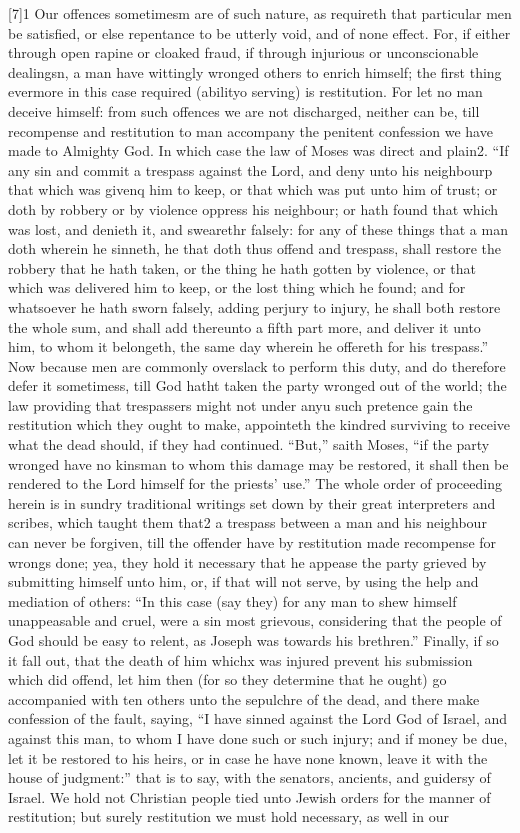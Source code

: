 [7]1 Our offences sometimesm are of such nature, as requireth that particular men be satisfied, or else repentance to be utterly void, and of none effect. For, if either through open rapine or cloaked fraud, if through injurious or unconscionable dealingsn, a man have wittingly wronged others to enrich himself; the first thing evermore in this case required (abilityo serving) is restitution. For let no man deceive himself: from such offences we are not discharged, neither can be, till recompense and restitution to man accompany the penitent confession we have made to Almighty God. In which case the law of Moses was direct and plain2. “If any sin and commit a trespass against the Lord, and deny unto his neighbourp that which was givenq him to keep, or that which was put unto him of trust; or doth by robbery or by violence oppress his neighbour; or hath found that which was lost, and denieth it, and swearethr falsely: for any of these things that a man doth wherein he sinneth, he that doth thus offend and trespass, shall restore the robbery that he hath taken, or the thing he hath gotten by violence, or that which was delivered him to keep, or the lost thing which he found; and for whatsoever he hath sworn falsely, adding perjury to injury, he shall both restore the whole sum, and shall add thereunto a fifth part more, and deliver  it unto him, to whom it belongeth, the same day wherein he offereth for his trespass.” Now because men are commonly overslack to perform this duty, and do therefore defer it sometimess, till God hatht taken the party wronged out of the world; the law providing that trespassers might not under anyu such pretence gain the restitution which they ought to make, appointeth the kindred surviving to receive what the dead should, if they had continued. “But,” saith Moses, “if the party wronged have no kinsman to whom this damage may be restored, it shall then be rendered to the Lord himself for the priests’ use.” The whole order of proceeding herein is in sundry traditional writings set down by their great interpreters and scribes, which taught them that2 a trespass between a man and his neighbour can never be forgiven, till the offender have by restitution made recompense for wrongs done; yea, they hold it necessary that he appease the party grieved by submitting himself unto him, or, if that will not serve, by using the help and mediation of others: “In this case (say they) for any man to shew himself unappeasable and cruel, were a sin most grievous, considering that the people of God should be easy to relent, as Joseph was towards his brethren.” Finally, if so it fall out, that the death of him whichx was injured prevent his submission which did offend, let him then (for so they determine that he ought) go accompanied with ten others unto the sepulchre of the dead, and there make confession of the fault, saying, “I have sinned against the Lord God of Israel, and against this man, to whom I have done such or such injury; and if money be due, let it be restored to his heirs, or in case he have none known, leave it with the house of judgment:” that is to say, with the senators, ancients, and guidersy of Israel. We hold not Christian people tied unto Jewish orders for the manner of restitution; but surely restitution we must hold necessary, as well in our 